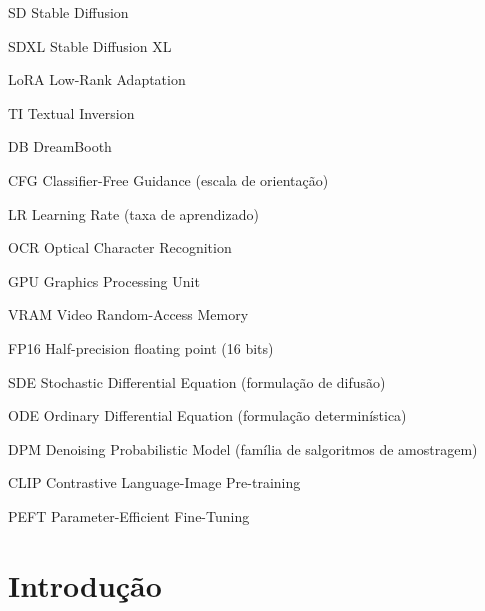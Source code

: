 \documentclass[12pt, %
openright, 
oneside, %
a4paper,    %
brazil]{facom-ufu-abntex2}
\begin{document}
\begin{siglas}
    \item[SD] Stable Diffusion
    \item[SDXL] Stable Diffusion XL
    \item[LoRA] Low-Rank Adaptation
    \item[TI] Textual Inversion
    \item[DB] DreamBooth
    \item[CFG] Classifier-Free Guidance (escala de orientação)
    \item[LR] Learning Rate (taxa de aprendizado)
    \item[OCR] Optical Character Recognition
    \item[GPU] Graphics Processing Unit
    \item[VRAM] Video Random-Access Memory
    \item[FP16] Half-precision floating point (16 bits)
    \item[SDE] Stochastic Differential Equation (formulação de difusão)
    \item[ODE] Ordinary Differential Equation (formulação determinística)
    \item[DPM] Denoising Probabilistic Model (família de salgoritmos de amostragem)
    \item[CLIP] Contrastive Language-Image Pre-training
    \item[PEFT] Parameter-Efficient Fine-Tuning
  \end{siglas}




\tableofcontents*
\cleardoublepage


\chapter{Introdução}
\end{document}
